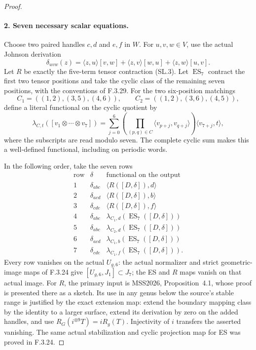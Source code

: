 \begin{proof}
\paragraph{2. Seven necessary scalar equations.}
Choose two paired handles $c,d$ and $e,f$ in $W$.
For $u,v,w\in V$, use the actual Johnson derivation
\[
 \delta_{uvw}(z)=\langle z,u\rangle[v,w]
              +\langle z,v\rangle[w,u]
              +\langle z,w\rangle[u,v].
\]
Let $R$ be exactly the five-term tensor contraction (SL.3).
Let $\operatorname{ES}_7$ contract the first two tensor
positions and take the cyclic class of the remaining seven
positions, with the conventions of F.3.29.
For the two six-position matchings
\[
 C_1=((1,2),(3,5),(4,6)),\qquad
 C_2=((1,2),(3,6),(4,5)),
\]
define a literal functional on the cyclic quotient by
\[
 \lambda_{C,t}([v_1\otimes\cdots\otimes v_7])
   =\sum_{j=0}^6
      \left(\prod_{(p,q)\in C}
         \langle v_{p+j},v_{q+j}\rangle\right)
         \langle v_{7+j},t\rangle,                         \tag{UC.3}
\]
where the subscripts are read modulo seven.
The complete cyclic sum makes this a well-defined
functional, including on periodic words.

In the following order, take the seven rows
\[
\begin{array}{c|c|c}
 \text{row}&\delta&\text{functional on the output}\\\hline
 1&\delta_{abc}&\langle R([D,\delta]),d\rangle\\
 2&\delta_{acd}&\langle R([D,\delta]),b\rangle\\
 3&\delta_{cde}&\langle R([D,\delta]),f\rangle\\
 4&\delta_{abc}&\lambda_{C_1,d}(\operatorname{ES}_7([D,\delta]))\\
 5&\delta_{abc}&\lambda_{C_2,d}(\operatorname{ES}_7([D,\delta]))\\
 6&\delta_{acd}&\lambda_{C_1,b}(\operatorname{ES}_7([D,\delta]))\\
 7&\delta_{cde}&\lambda_{C_1,f}(\operatorname{ES}_7([D,\delta])).
\end{array}                                                \tag{UC.4}
\]
Every row vanishes on the actual $U_{g,6}$: the actual
normalizer and strict geometric-image maps of F.3.24 give
$[U_{g,6},J_1]\subset J_7$; the ES and $R$ maps vanish
on that actual image. For $R$, the primary input is
MSS2026, Proposition~4.1, whose proof is presented there
as a sketch\cite[pp.~10--11]{AuditMoritaSakasaiSuzuki2026v1}.
Its use in any genus below the source's stable range is
justified by the exact extension map: extend the boundary
mapping class by the identity to a larger surface, extend
its derivation by zero on the added handles, and use
$R_G(i^{\otimes9}T)=iR_g(T)$. Injectivity of $i$ transfers
the asserted vanishing. The same actual stabilization and
cyclic projection map for ES was proved in F.3.24.


\end{proof}
